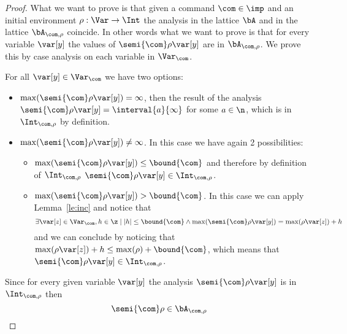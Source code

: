 \begin{proof}
  What we want to prove is that given a command \(\com\in\imp\) and an
  initial environment \(\rho : \Var \to \Int\) the analysis in the
  lattice \(\bA\) and in the lattice \(\bA_{\com,\rho}\) coincide. In
  other words what we want to prove is that for every variable
  \(\var[y]\) the values of \(\semi{\com}\rho\var[y]\) are in
  \(\bA_{\com,\rho}\). We prove this by case analysis on each variable
  in \(\Var_{\com}\).  \medskip

  \noindent
  For all \(\var[y] \in \Var_{\com}\) we have two options:
  \begin{itemize}
  \item \(\max(\semi{\com}\rho\var[y]) = \infty\), then the result of
    the analysis \(\semi{\com}\rho\var[y] = \interval{a}{\infty}\) for
    some \(a\in\n\), which is in \(\Int_{\com, \rho}\) by definition.
  \item \(\max(\semi{\com}\rho\var[y]) \neq \infty\). In this case we
    have again 2 possibilities:
    \begin{itemize}
    \item \(\max(\semi{\com}\rho\var[y]) \leq \bound{\com}\) and
      therefore by definition of \(\Int_{\com,\rho}\)
      \(\semi{\com}\rho\var[y] \in \Int_{\com, \rho}\).
      
    \item \(\max(\semi{\com}\rho\var[y]) > \bound{\com}\). In this
      case we can apply Lemma~\ref{le:inc} and notice that
      \begin{equation*}
        \exists \var[z] \in \Var_{\com}, h \in \z \mid \left|h\right| \leq \bound{\com} \wedge \max(\semi{\com}\rho\var[y]) = \max(\rho\var[z]) + h
      \end{equation*}
      and we can conclude by noticing that
      \(\max(\rho\var[z]) + h\leq \max(\rho) + \bound{\com}\), which
      means that \(\semi{\com}\rho\var[y] \in \Int_{\com, \rho}\).
    \end{itemize}
  \end{itemize}

  Since for every given variable \(\var[y]\) the analysis
  \(\semi{\com}\rho\var[y]\) is in \(\Int_{\com,\rho}\) then
  \[\semi{\com}\rho \in \bA_{\com,\rho}\]
\end{proof}
